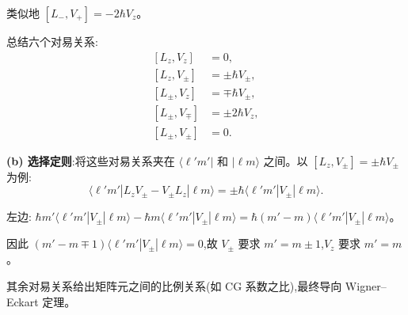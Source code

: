 \begin{solution}
	类似地 $[L_-,V_+] = -2\hbar V_z$。

	总结六个对易关系:
	\[
	\boxed{
	\begin{aligned}
	[L_z,V_z] &= 0, \\
	[L_z,V_\pm] &= \pm\hbar V_\pm, \\
	[L_\pm,V_z] &= \mp\hbar V_\pm, \\
	[L_\pm,V_\mp] &= \pm 2\hbar V_z, \\
	[L_\pm,V_\pm] &= 0.
	\end{aligned}}
	\]

	\textbf{(b) 选择定则}:将这些对易关系夹在 $\langle\ell'm'|$ 和 $|\ell m\rangle$ 之间。以 $[L_z,V_\pm]=\pm\hbar V_\pm$ 为例:
	\[
	\langle\ell'm'|L_zV_\pm - V_\pm L_z|\ell m\rangle = \pm\hbar\langle\ell'm'|V_\pm|\ell m\rangle.
	\]

	左边:
	$\hbar m'\langle\ell'm'|V_\pm|\ell m\rangle - \hbar m\langle\ell'm'|V_\pm|\ell m\rangle = \hbar(m'-m)\langle\ell'm'|V_\pm|\ell m\rangle$。

	因此 $(m'-m\mp1)\langle\ell'm'|V_\pm|\ell m\rangle=0$,故 $V_\pm$ 要求 $m'=m\pm1$,$V_z$ 要求 $m'=m$。

	其余对易关系给出矩阵元之间的比例关系(如 CG 系数之比),最终导向 Wigner--Eckart 定理。
	\end{solution}

